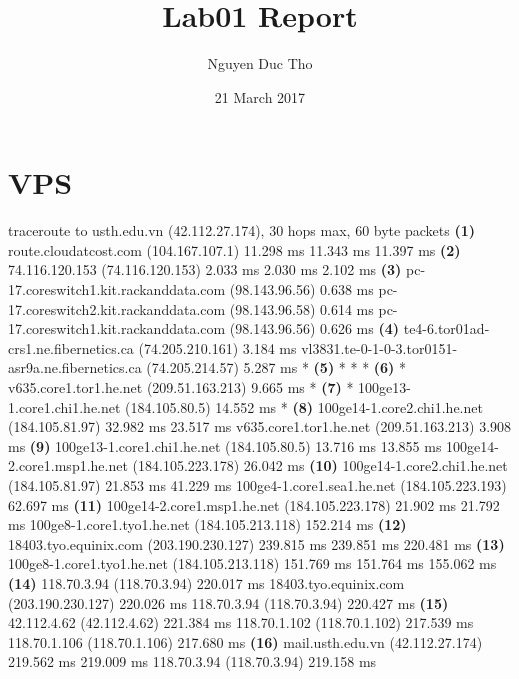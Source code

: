 \documentclass{article}
\title{Lab01 Report}
\author{Nguyen Duc Tho}
\date{21 March 2017}
\begin{document}
\maketitle
\section{VPS}
traceroute to usth.edu.vn (42.112.27.174), 30 hops max, 60 byte packets\linebreak
 \textbf{(1)}  route.cloudatcost.com (104.167.107.1)  11.298 ms  11.343 ms  11.397 ms\linebreak
 \textbf{(2)}  74.116.120.153 (74.116.120.153)  2.033 ms  2.030 ms  2.102 ms\linebreak
 \textbf{(3)}  pc-17.coreswitch1.kit.rackanddata.com (98.143.96.56)  0.638 ms pc-17.coreswitch2.kit.rackanddata.com (98.143.96.58)  0.614 ms pc-17.coreswitch1.kit.rackanddata.com (98.143.96.56)  0.626 ms\linebreak
 \textbf{(4)}  te4-6.tor01ad-crs1.ne.fibernetics.ca (74.205.210.161)  3.184 ms vl3831.te-0-1-0-3.tor0151-asr9a.ne.fibernetics.ca (74.205.214.57)  5.287 ms *\linebreak
 \textbf{(5)}  * * *\linebreak
 \textbf{(6)}  * v635.core1.tor1.he.net (209.51.163.213)  9.665 ms *\linebreak
 \textbf{(7)}  * 100ge13-1.core1.chi1.he.net (184.105.80.5)  14.552 ms *\linebreak
 \textbf{(8)}  100ge14-1.core2.chi1.he.net (184.105.81.97)  32.982 ms  23.517 ms v635.core1.tor1.he.net (209.51.163.213)  3.908 ms\linebreak
 \textbf{(9)}  100ge13-1.core1.chi1.he.net (184.105.80.5)  13.716 ms  13.855 ms 100ge14-2.core1.msp1.he.net (184.105.223.178)  26.042 ms\linebreak
\textbf{(10)}  100ge14-1.core2.chi1.he.net (184.105.81.97)  21.853 ms  41.229 ms 100ge4-1.core1.sea1.he.net (184.105.223.193)  62.697 ms\linebreak
\textbf{(11)}  100ge14-2.core1.msp1.he.net (184.105.223.178)  21.902 ms  21.792 ms 100ge8-1.core1.tyo1.he.net (184.105.213.118)  152.214 ms\linebreak
\textbf{(12)}  18403.tyo.equinix.com (203.190.230.127)  239.815 ms  239.851 ms  220.481 ms\linebreak
\textbf{(13)}  100ge8-1.core1.tyo1.he.net (184.105.213.118)  151.769 ms  151.764 ms  155.062 ms\linebreak
\textbf{(14)}  118.70.3.94 (118.70.3.94)  220.017 ms 18403.tyo.equinix.com (203.190.230.127)  220.026 ms 118.70.3.94 (118.70.3.94)  220.427 ms\linebreak
\textbf{(15)}  42.112.4.62 (42.112.4.62)  221.384 ms 118.70.1.102 (118.70.1.102)  217.539 ms 118.70.1.106 (118.70.1.106)  217.680 ms\linebreak
\textbf{(16)}  mail.usth.edu.vn (42.112.27.174)  219.562 ms  219.009 ms 118.70.3.94 (118.70.3.94)  219.158 ms\linebreak
\end{document}
